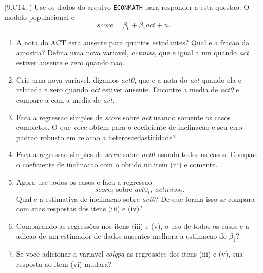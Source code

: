 \documentclass[12pt,letterpaper, onecolumn]{exam}
\begin{document}
\begin{questions}
\question\qstar (9.C14, \citep{wooldridge2016}) Use os dados do arquivo \texttt{ECONMATH} para responder a esta questao. O modelo populacional e
\[
score=\beta_0+\beta_1 act+u.
\]
\begin{enumerate}[label=(\roman*)]
    \item A nota do ACT esta ausente para quantos estudantes? Qual e a fracao da amostra? Defina uma nova variavel, \textit{actmiss}, que e igual a um quando \textit{act} estiver ausente e zero quando nao.
    \item Crie uma nova variavel, digamos \textit{act0}, que e a nota do \textit{act} quando ela e relatada e zero quando \textit{act} estiver ausente. Encontre a media de \textit{act0} e compare-a com a media de \textit{act}.
    \item Faca a regressao simples de \textit{score} sobre \textit{act} usando somente os casos completos. O que voce obtem para o coeficiente de inclinacao e seu erro padrao robusto em relacao a heteroscedasticidade?
    \item Faca a regressao simples de \textit{score} sobre \textit{act0} usando todos os casos. Compare o coeficiente de inclinacao com o obtido no item (iii) e comente.
    \item Agora use todos os casos e faca a regressao
    \[
    score_i \text{ sobre } act0_i,\; actmiss_i.
    \]
    Qual e a estimativa de inclinacao sobre \textit{act0}? De que forma isso se compara com suas respostas dos itens (iii) e (iv)?
    \item Comparando as regressões nos itens (iii) e (v), o uso de todos os casos e a adicao de um estimador de dados ausentes melhora a estimacao de \(\beta_1\)?
    \item Se voce adicionar a variavel \textit{colgpa} as regressões dos itens (iii) e (v), sua resposta ao item (vi) mudara?
\end{enumerate}

\end{questions}
\newpage


\end{document}
